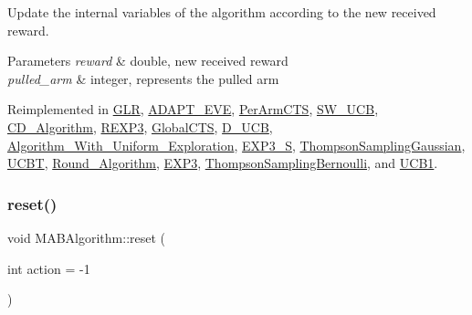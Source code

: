 Update the internal variables of the algorithm according to the new received reward. 


\begin{DoxyParams}{Parameters}
{\em reward} & double, new received reward \\
\hline
{\em pulled\+\_\+arm} & integer, represents the pulled arm \\
\hline
\end{DoxyParams}


Reimplemented in \mbox{\hyperlink{class_g_l_r_ad8e409518a110bd57f42a2de1b759707}{G\+LR}}, \mbox{\hyperlink{class_a_d_a_p_t___e_v_e_ab626b3d8e8f27200e35a0fc3c80f9539}{A\+D\+A\+P\+T\+\_\+\+E\+VE}}, \mbox{\hyperlink{class_per_arm_c_t_s_af9ac7b45d329223ce506e977b96a32ee}{Per\+Arm\+C\+TS}}, \mbox{\hyperlink{class_s_w___u_c_b_acddb0c5385d33d332a2fbf1b739142c2}{S\+W\+\_\+\+U\+CB}}, \mbox{\hyperlink{class_c_d___algorithm_a2427ddf68550eda00a0992b875c10834}{C\+D\+\_\+\+Algorithm}}, \mbox{\hyperlink{class_r_e_x_p3_a535d6667ecfa71568a68a5a09c44d4bf}{R\+E\+X\+P3}}, \mbox{\hyperlink{class_global_c_t_s_acb2f35fa8c6b2ae61912f6f337ed815f}{Global\+C\+TS}}, \mbox{\hyperlink{class_d___u_c_b_a23b79f3f23095ae6e824b36a3856ff7c}{D\+\_\+\+U\+CB}}, \mbox{\hyperlink{class_algorithm___with___uniform___exploration_a946808f681cd7b54bd557e1d8f15c5d0}{Algorithm\+\_\+\+With\+\_\+\+Uniform\+\_\+\+Exploration}}, \mbox{\hyperlink{class_e_x_p3___s_a93cef92a4f0213f7d247768b610071ad}{E\+X\+P3\+\_\+S}}, \mbox{\hyperlink{class_thompson_sampling_gaussian_a21d02f760e6738a8e209f46e57ffa341}{Thompson\+Sampling\+Gaussian}}, \mbox{\hyperlink{class_u_c_b_t_a0e9b24c391f3934e59809419e0b04e52}{U\+C\+BT}}, \mbox{\hyperlink{class_round___algorithm_a945da188a51c00d1923f4eb8434042eb}{Round\+\_\+\+Algorithm}}, \mbox{\hyperlink{class_e_x_p3_a9408f963aa533ffb298deba2fbc65529}{E\+X\+P3}}, \mbox{\hyperlink{class_thompson_sampling_bernoulli_a02d2aabd642f0b1149963539178f2a1e}{Thompson\+Sampling\+Bernoulli}}, and \mbox{\hyperlink{class_u_c_b1_a79106e98a38550c3f1f03e10f72226c6}{U\+C\+B1}}.

\mbox{\label{class_m_a_b_algorithm_ad5761cee0b0e3421d1f043dbcc0b5f85}} 
\subsubsection{\texorpdfstring{reset()}{reset()}}
{\footnotesize\ttfamily void M\+A\+B\+Algorithm\+::reset (\begin{DoxyParamCaption}\item[{int}]{action = {\ttfamily -\/1} }\end{DoxyParamCaption})\hspace{0.3cm}{\ttfamily [virtual]}}



